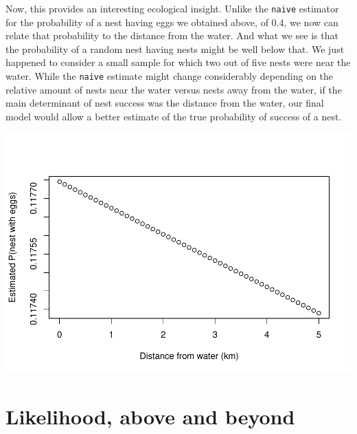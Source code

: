 \documentclass[
]{book}
\newenvironment{Shaded}{\begin{snugshade}}{\end{snugshade}}
\newcommand{\AttributeTok}[1]{\textcolor[rgb]{0.77,0.63,0.00}{#1}}
\newcommand{\DecValTok}[1]{\textcolor[rgb]{0.00,0.00,0.81}{#1}}
\newcommand{\FloatTok}[1]{\textcolor[rgb]{0.00,0.00,0.81}{#1}}
\newcommand{\FunctionTok}[1]{\textcolor[rgb]{0.00,0.00,0.00}{#1}}
\newcommand{\NormalTok}[1]{#1}
\newcommand{\OtherTok}[1]{\textcolor[rgb]{0.56,0.35,0.01}{#1}}
\newcommand{\SpecialCharTok}[1]{\textcolor[rgb]{0.00,0.00,0.00}{#1}}
\newcommand{\StringTok}[1]{\textcolor[rgb]{0.31,0.60,0.02}{#1}}
\begin{document}
Now, this provides an interesting ecological insight. Unlike the \texttt{naive} estimator for the probability of a nest having eggs we obtained above, of 0.4, we now can relate that probability to the distance from the water. And what we see is that the probability of a random nest having nests might be well below that. We just happened to consider a small sample for which two out of five nests were near the water. While the \texttt{naive} estimate might change considerably depending on the relative amount of nests near the water versus nests away from the water, if the main determinant of nest success was the distance from the water, our final model would allow a better estimate of the true probability of success of a nest.

\begin{Shaded}
\end{Shaded}

\includegraphics{ECOMODbook_files/figure-latex/ch13.36-1.pdf}

\hypertarget{likelihood-above-and-beyond}{%
\section{Likelihood, above and beyond}\label{likelihood-above-and-beyond}}
\end{document}

